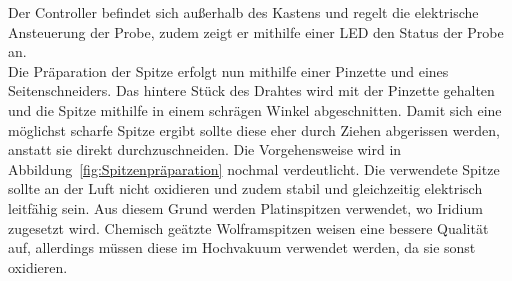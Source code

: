 \documentclass[a4paper,twoside,final]{article}
\begin{document}
Der Controller befindet sich außerhalb des Kastens und regelt die elektrische Ansteuerung der Probe, zudem zeigt er mithilfe einer LED den Status der Probe an.\\
Die Präparation der Spitze erfolgt nun mithilfe einer Pinzette und eines Seitenschneiders. Das hintere Stück des Drahtes wird mit der Pinzette gehalten und die Spitze mithilfe in einem schrägen Winkel abgeschnitten. Damit sich eine möglichst scharfe Spitze ergibt sollte diese eher durch Ziehen abgerissen werden, anstatt sie direkt durchzuschneiden. Die Vorgehensweise wird in Abbildung~\ref{fig:Spitzenpräparation} nochmal verdeutlicht. Die verwendete Spitze sollte an der Luft nicht oxidieren und zudem stabil und gleichzeitig elektrisch leitfähig sein. Aus diesem Grund werden Platinspitzen verwendet, wo Iridium zugesetzt wird. Chemisch geätzte Wolframspitzen weisen eine bessere Qualität auf, allerdings müssen diese im Hochvakuum verwendet werden, da sie sonst oxidieren.
\end{document}
